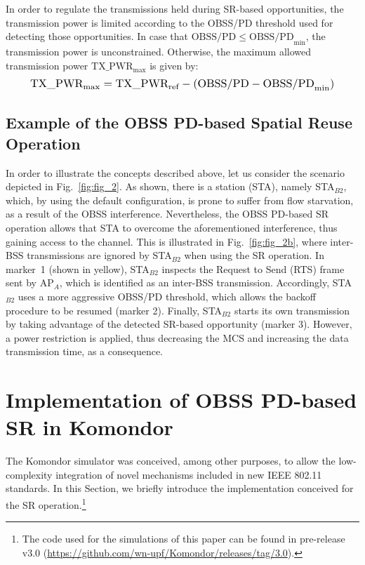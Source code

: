 \documentclass[conference]{IEEEtran}
\begin{document}
	In order to regulate the transmissions held during SR-based opportunities, the transmission power is limited according to the OBSS/PD threshold used for detecting those opportunities. In case that $\text{OBSS/PD} \leq \text{OBSS/PD}_{\min}$, the transmission power is unconstrained. Otherwise, the maximum allowed transmission power $\text{TX\_PWR}_{\max}$ is given by:
	\begin{equation}
	\resizebox{.9\columnwidth}{!}{$\text{TX\_PWR}_{\max} = \text{TX\_PWR}_{\text{ref}} - (\text{OBSS/PD} -\text{OBSS/PD}_{\min})$}
	\label{eq:power_restriction}
	\end{equation}
		
	\subsection{Example of the OBSS PD-based Spatial Reuse Operation}

	In order to illustrate the concepts described above, let us consider the scenario depicted in Fig.~\ref{fig:fig_2}. As shown, there is a station (STA), namely STA$_{B2}$, which, by using the default configuration, is prone to suffer from flow starvation, as a result of the OBSS interference. Nevertheless, the OBSS PD-based SR operation allows that STA to overcome the aforementioned interference, thus gaining access to the channel. This is illustrated in Fig.~\ref{fig:fig_2b}, where inter-BSS transmissions are ignored by STA$_{B2}$ when using the SR operation. In marker~1 (shown in yellow), STA$_{B2}$ inspects the Request to Send (RTS) frame sent by AP$_A$, which is identified as an inter-BSS transmission. Accordingly, STA$_{B2}$ uses a more aggressive OBSS/PD threshold, which allows the backoff procedure to be resumed (marker 2). Finally, STA$_{B2}$ starts its own transmission by taking advantage of the detected SR-based opportunity (marker 3). However, a power restriction is applied, thus decreasing the MCS and increasing the data transmission time, as a consequence.
	
	\section{Implementation of OBSS PD-based SR in Komondor}
	\label{section:komondor}
	
	The Komondor simulator was conceived, among other purposes, to allow the low-complexity integration of novel mechanisms included in new IEEE 802.11 standards. In this Section, we briefly introduce the implementation conceived for the SR operation.\footnote{The code used for the simulations of this paper can be found in pre-release v3.0 (\url{https://github.com/wn-upf/Komondor/releases/tag/3.0}).}
	
\end{document}
